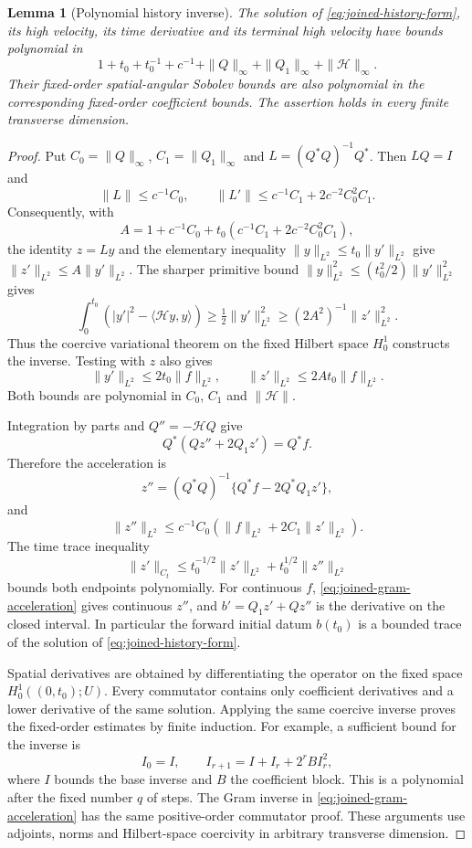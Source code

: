 \documentclass[11pt]{article}
\newtheorem{lemma}[theorem]{Lemma}
\theoremstyle{definition}
\begin{document}
\begin{lemma}[Polynomial history inverse]\label{lem:joined-history-polynomial}
The solution of \eqref{eq:joined-history-form}, its high velocity,
its time derivative and its terminal high velocity have bounds
polynomial in
\[
 1+t_0+t_0^{-1}+c^{-1}+
 \|Q\|_\infty+\|Q_1\|_\infty+\|\mathcal H\|_\infty .
\]
Their fixed-order spatial-angular Sobolev bounds are also polynomial in
the corresponding fixed-order coefficient bounds. The assertion holds
in every finite transverse dimension.
\end{lemma}
\begin{proof}
Put $C_0=\|Q\|_\infty$, $C_1=\|Q_1\|_\infty$ and
$L=(Q^*Q)^{-1}Q^*$. Then $LQ=I$ and
\[
 \|L\|\leq c^{-1}C_0,\qquad
 \|L'\|\leq c^{-1}C_1+2c^{-2}C_0^2C_1.
\]
Consequently, with
\[
 A=1+c^{-1}C_0+
       t_0(c^{-1}C_1+2c^{-2}C_0^2C_1),
\]
the identity $z=Ly$ and the elementary inequality
$\|y\|_{L^2}\leq t_0\|y'\|_{L^2}$ give
$\|z'\|_{L^2}\leq A\|y'\|_{L^2}$.
The sharper primitive bound
$\|y\|_{L^2}^2\leq(t_0^2/2)\|y'\|_{L^2}^2$ gives
\[
 \int_0^{t_0}(|y'|^2-\langle\mathcal Hy,y\rangle)
 \geq\tfrac12\|y'\|_{L^2}^2
 \geq(2A^2)^{-1}\|z'\|_{L^2}^2.
\]
Thus the coercive variational theorem on the fixed Hilbert space $H^1_0$
constructs the inverse. Testing with $z$ also gives
\[
 \|y'\|_{L^2}\leq2t_0\|f\|_{L^2},\qquad
 \|z'\|_{L^2}\leq2At_0\|f\|_{L^2}.
\]
Both bounds are polynomial in $C_0$, $C_1$ and $\|\mathcal H\|$.

Integration by parts and $Q''=-\mathcal HQ$ give
\[
 Q^*(Qz''+2Q_1z')=Q^*f.
\]
Therefore the acceleration is
\begin{equation}\label{eq:joined-gram-acceleration}
 z''=(Q^*Q)^{-1}\{Q^*f-2Q^*Q_1z'\},
\end{equation}
and
\[
 \|z''\|_{L^2}\leq
 c^{-1}C_0(\|f\|_{L^2}+2C_1\|z'\|_{L^2}).
\]
The time trace inequality
\[
 \|z'\|_{C_t}\leq
 t_0^{-1/2}\|z'\|_{L^2}+t_0^{1/2}\|z''\|_{L^2}
\]
bounds both endpoints polynomially. For continuous $f$,
\eqref{eq:joined-gram-acceleration} gives continuous $z''$, and
$b'=Q_1z'+Qz''$ is the derivative on the closed interval.
In particular the forward initial datum $b(t_0)$ is a bounded trace
of the solution of \eqref{eq:joined-history-form}.

Spatial derivatives are obtained by differentiating the operator on
the fixed space $H^1_0((0,t_0);U)$. Every commutator contains only
coefficient derivatives and a lower derivative of the same solution.
Applying the same coercive inverse proves the fixed-order estimates
by finite induction. For example, a sufficient bound for the inverse is
\[
 I_0=I,\qquad I_{r+1}=I+I_r+2^rB I_r^2,
\]
where $I$ bounds the base inverse and $B$ the coefficient block.
This is a polynomial after the fixed number $q$ of steps.
The Gram inverse in \eqref{eq:joined-gram-acceleration} has the same
positive-order commutator proof. These arguments use adjoints, norms
and Hilbert-space coercivity in arbitrary transverse dimension.
\end{proof}
\end{document}
